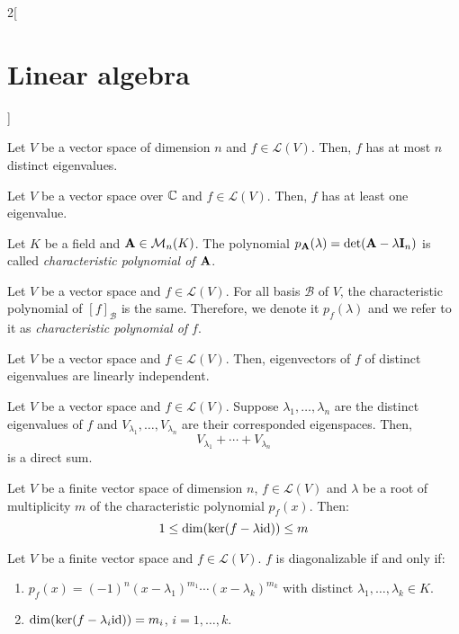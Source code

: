 \documentclass[../../../main.tex]{subfiles}
\begin{document}
\begin{multicols}{2}[\section{Linear algebra}]
\begin{lemma}
  \end{lemma}
  \begin{corollary}
    Let $V$ be a vector space of dimension $n$ and $f\in\mathcal{L}(V)$. Then, $f$ has at most $n$ distinct eigenvalues.
  \end{corollary}
  \begin{corollary}
    Let $V$ be a vector space over $\mathbb{C}$ and $f\in\mathcal{L}(V)$. Then, $f$ has at least one eigenvalue.
  \end{corollary}
  \begin{definition}
    Let $K$ be a field and $\boldsymbol{\mathrm{A}}\in\mathcal{M}_n(K)$. The polynomial $p_{\boldsymbol{\mathrm{A}}}(\lambda)=\det(\boldsymbol{\mathrm{A}}-\lambda \boldsymbol{\mathrm{I}}_n)$ is called \textit{characteristic polynomial of $\boldsymbol{\mathrm{A}}$}.
  \end{definition}
  \begin{prop}
    Let $V$ be a vector space and $f\in\mathcal{L}(V)$. For all basis $\mathcal{B}$ of $V$, the characteristic polynomial of $[f]_\mathcal{B}$ is the same. Therefore, we denote it $p_f(\lambda)$ and we refer to it as \textit{characteristic polynomial of $f$}.
  \end{prop}
  \begin{prop}
    Let $V$ be a vector space and $f\in\mathcal{L}(V)$. Then, eigenvectors of $f$ of distinct eigenvalues are linearly independent.
  \end{prop}
  \begin{corollary}
    Let $V$ be a vector space and $f\in\mathcal{L}(V)$. Suppose $\lambda_1,\ldots,\lambda_n$ are the distinct eigenvalues of $f$ and $V_{\lambda_1},\ldots,V_{\lambda_n}$ are their corresponded eigenspaces. Then, $$V_{\lambda_1}+\cdots+V_{\lambda_n}$$ is a direct sum.
  \end{corollary}
  \begin{prop}
    Let $V$ be a finite vector space of dimension $n$, $f\in\mathcal{L}(V)$ and $\lambda$ be a root of multiplicity $m$ of the characteristic polynomial $p_f(x)$. Then: $$1\leq \dim(\ker(f-\lambda\mathrm{id}))\leq m$$
  \end{prop}
  \begin{theorem}
    Let $V$ be a finite vector space and $f\in\mathcal{L}(V)$. $f$ is diagonalizable if and only if:
    \begin{enumerate}
      \item $p_f(x)=(-1)^n(x-\lambda_1)^{m_1}\cdots(x-\lambda_k)^{m_k}$ with distinct $\lambda_1,\ldots,\lambda_k\in K$.
      \item $\dim(\ker(f-\lambda_i \mathrm{id}))=m_i$, $i=1,\ldots,k$.

\end{enumerate}
\end{theorem}
\end{multicols}
\end{document}
